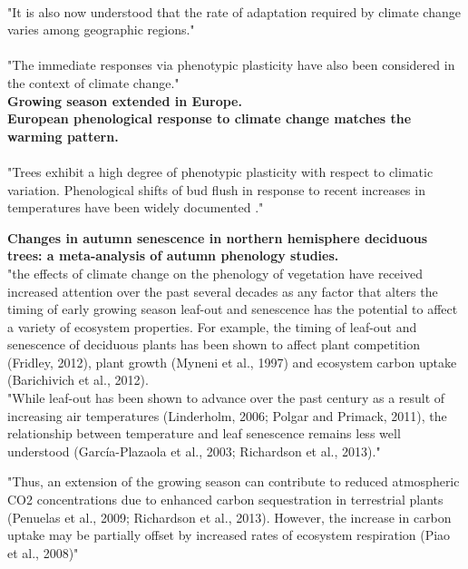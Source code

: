 \documentclass{article}
\begin{document}
\citep{Loarie09}\\ 
"It is also now understood that the rate of adaptation required by climate change varies among geographic regions." \\

\citep{Nicotra10}\\ 
"The immediate responses via phenotypic plasticity have also been considered in the context of climate change." \\

\citep{Menzel99} \textbf{Growing season extended in Europe.}\\
\citep{Menzel06} \textbf{European phenological response to climate change matches the warming pattern.}\\
\citep{Parmesan06}\\
"Trees exhibit a high degree of phenotypic plasticity with respect to climatic variation. Phenological shifts of bud flush in response to recent increases in temperatures have been widely documented ." 


\citep{Gill15} \textbf{Changes in autumn senescence in northern hemisphere deciduous trees: a meta-analysis of autumn phenology studies.} \\
"the effects of climate change on the phenology of vegetation have received increased attention over the past several decades as any factor that alters the timing of early growing season leaf-out and senescence has the potential to affect a variety of ecosystem properties. For example, the timing of leaf-out and senescence of deciduous plants has been shown to affect plant competition (Fridley, 2012), plant growth (Myneni et al., 1997) and ecosystem carbon uptake (Barichivich et al., 2012).\\

"While leaf-out has been shown to advance over the past century as a result of increasing air temperatures (Linderholm, 2006; Polgar and Primack, 2011), the relationship between temperature and leaf senescence remains less well understood (García-Plazaola et al., 2003; Richardson et al., 2013)."

"Thus, an extension of the growing season can contribute to reduced atmospheric CO2 concentrations due to enhanced carbon sequestration in terrestrial plants (Penuelas et al., 2009; Richardson et al., 2013). However, the increase in carbon uptake may be partially offset by increased rates of ecosystem respiration (Piao et al., 2008)"
\end{document}
